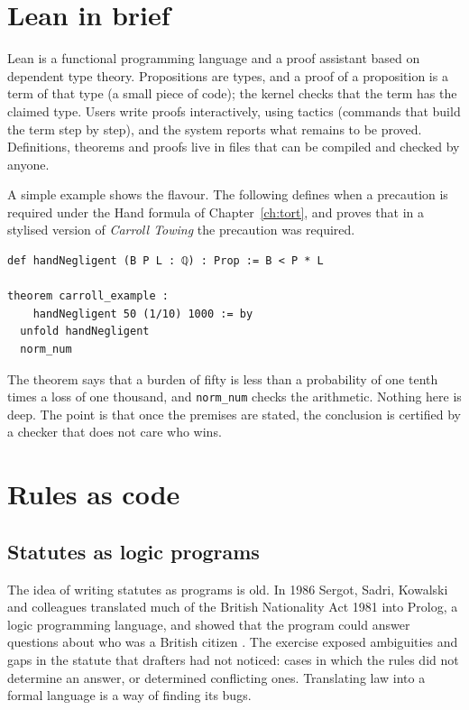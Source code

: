 \section{Lean in brief}

Lean is a functional programming language and a proof assistant based on dependent type theory. Propositions are types, and a proof of a proposition is a term of that type (a small piece of code); the kernel checks that the term has the claimed type. Users write proofs interactively, using tactics (commands that build the term step by step), and the system reports what remains to be proved. Definitions, theorems and proofs live in files that can be compiled and checked by anyone.

A simple example shows the flavour. The following defines when a precaution is required under the Hand formula of Chapter~\ref{ch:tort}, and proves that in a stylised version of \emph{Carroll Towing} the precaution was required.

\begin{lstlisting}[language=Lean, caption={The Hand formula as a Lean proposition.}]
def handNegligent (B P L : ℚ) : Prop := B < P * L

theorem carroll_example :
    handNegligent 50 (1/10) 1000 := by
  unfold handNegligent
  norm_num
\end{lstlisting}

The theorem says that a burden of fifty is less than a probability of one tenth times a loss of one thousand, and \texttt{norm\_num} checks the arithmetic. Nothing here is deep. The point is that once the premises are stated, the conclusion is certified by a checker that does not care who wins.

\section{Rules as code}

\subsection{Statutes as logic programs}

The idea of writing statutes as programs is old. In 1986 Sergot, Sadri, Kowalski and colleagues translated much of the British Nationality Act 1981 into Prolog, a logic programming language, and showed that the program could answer questions about who was a British citizen \citep{sergot1986}. The exercise exposed ambiguities and gaps in the statute that drafters had not noticed: cases in which the rules did not determine an answer, or determined conflicting ones. Translating law into a formal language is a way of finding its bugs.

